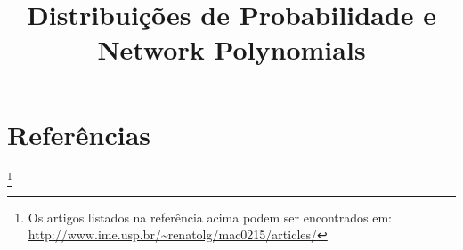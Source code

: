 \documentclass[a4paper,10pt]{article}
\title{\textbf{Distribuições de Probabilidade e Network Polynomials}}
\newcommand\blfootnote[1]{%
  \begingroup
  \renewcommand\thefootnote{}\footnote{#1}%
  \addtocounter{footnote}{-1}%
  \endgroup
}
\theoremstyle{plain}
\begin{document}
\date{}
\author{}
\vspace*{-40pt}
{\let\newpage\relax\maketitle}

\newpage

\section{Referências}

\printbibliography[title={Artigos},type=article]
\printbibliography[title={Websites},type=misc]

\blfootnote{Os artigos listados na referência acima podem ser encontrados em: 
  \url{http://www.ime.usp.br/~renatolg/mac0215/articles/}}
\end{document}
